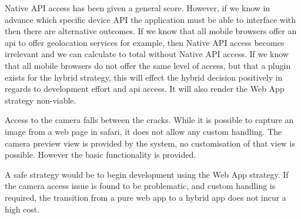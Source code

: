 Native API access has been given a general score. However, if we know in advance which specific device API the application must be able to interface with then there are alternative outcomes. If we know that all mobile browsers offer an api to offer geolocation services for example, then Native API access becomes irrelevant and we can calculate to total without Native API access. If we know that all mobile browsers do not offer the same level of access, but that a plugin exists for the hybrid strategy, this will effect the hybrid decision positively in regards to development effort and api access. It will also render the Web App strategy non-viable.

Access to the camera falls between the cracks. While it is possible to capture an image from a web page in safari, it does not allow any custom handling. The camera preview view is provided by the system, no customisation of that view is possible. However the basic functionality is provided.

A safe strategy would be to begin development using the Web App strategy. If the camera access issue is found to be problematic, and custom handling is required, the transition from a pure web app to a hybrid app does not incur a high cost.